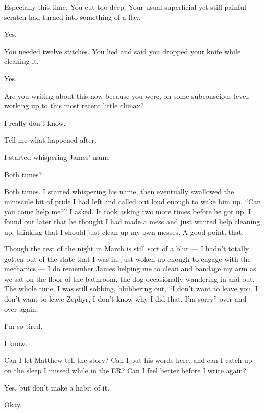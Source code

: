 \begin{ally}
Especially this time. You cut too deep. Your usual superficial-yet-still-painful scratch had turned into something of a flay.
\end{ally}
Yes.

\begin{ally}
You needed twelve stitches. You lied and said you dropped your knife while cleaning it.
\end{ally}
Yes.

\begin{ally}
Are you writing about this now because you were, on some subconscious level, working up to this most recent little climax?
\end{ally}
I really don't know.

\begin{ally}
Tell me what happened after.
\end{ally}
I started whispering James' name--

\begin{ally}
Both times?
\end{ally}
Both times. I started whispering his name, then eventually swallowed the miniscule bit of pride I had left and called out loud enough to wake him up. ``Can you come help me?'' I asked. It took asking two more times before he got up. I found out later that he thought I had made a mess and just wanted help cleaning up, thinking that I should just clean up my own messes. A good point, that.

Though the rest of the night in March is still sort of a blur --- I hadn't totally gotten out of the state that I was in, just woken up enough to engage with the mechanics --- I do remember James helping me to clean and bandage my arm as we sat on the floor of the bathroom, the dog occasionally wandering in and out. The whole time, I was still sobbing, blubbering out, ``I don't want to leave you, I don't want to leave Zephyr, I don't know why I did that, I'm sorry'' over and over again.
\newpage

I'm so tired.

\begin{ally}
I know.
\end{ally}
Can I let Matthew tell the story? Can I put his words here, and can I catch up on the sleep I missed while in the ER? Can I feel better before I write again?

\begin{ally}
Yes, but don't make a habit of it.
\end{ally}
Okay.

